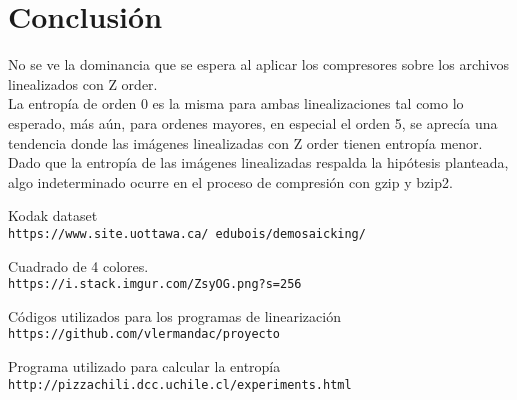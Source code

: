 \documentclass[12pt]{article}
\begin{document}
\section*{Conclusión}
No se ve la dominancia que se espera al aplicar los compresores sobre los
archivos linealizados con Z order.\\
La entropía de orden 0 es la misma para ambas linealizaciones tal como lo
esperado, más aún, para ordenes mayores, en especial el orden 5, se aprecía
una tendencia donde las imágenes linealizadas con Z order tienen entropía menor.
\\
Dado que la entropía de las imágenes linealizadas respalda la hipótesis planteada, algo indeterminado ocurre en el proceso de compresión con gzip y bzip2.


\begin{thebibliography}{9}
Kodak dataset
\\\texttt{https://www.site.uottawa.ca/~edubois/demosaicking/}

Cuadrado de 4 colores.
\\\texttt{https://i.stack.imgur.com/ZsyOG.png?s=256}


Códigos utilizados para los programas de linearización
\\\texttt{https://github.com/vlermandac/proyecto}

Programa utilizado para calcular la entropía
\\\texttt{http://pizzachili.dcc.uchile.cl/experiments.html}

\end{thebibliography}
\end{document}
